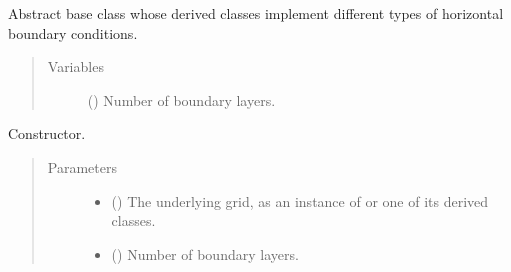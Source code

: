 \documentclass[letterpaper,10pt,english]{sphinxmanual}
\begin{document}
\begin{fulllineitems}
\label{\detokenize{api:dycore.horizontal_boundary.HorizontalBoundary}}
Abstract base class whose derived classes implement different types of horizontal boundary conditions.
\begin{quote}\begin{description}
\item[{Variables}] \leavevmode
{\hyperref[\detokenize{api:dycore.isentropic_prognostic.IsentropicPrognostic.nb}]{}} () \textendash{} Number of boundary layers.

\end{description}\end{quote}

\begin{fulllineitems}
\label{\detokenize{api:dycore.horizontal_boundary.HorizontalBoundary.__init__}}
Constructor.
\begin{quote}\begin{description}
\item[{Parameters}] \leavevmode\begin{itemize}
\item {} 
 () \textendash{} The underlying grid, as an instance of {\hyperref[\detokenize{api:grids.xyz_grid.XYZGrid}]{}} or one of
its derived classes.

\item {} 
 () \textendash{} Number of boundary layers.

\end{itemize}

\end{description}\end{quote}

\end{fulllineitems}



\end{fulllineitems}
\end{document}
